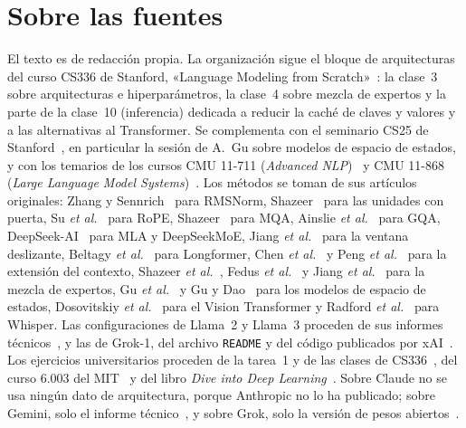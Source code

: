 \documentclass[11pt,a4paper,twoside,openany]{book}
\begin{document}
\section*{Sobre las fuentes}
El texto es de redacción propia. La organización sigue el bloque de arquitecturas del curso CS336 de Stanford, «Language Modeling from Scratch»~\cite{cs336}: la clase~3 sobre arquitecturas e hiperparámetros, la clase~4 sobre mezcla de expertos y la parte de la clase~10 (inferencia) dedicada a reducir la caché de claves y valores y a las alternativas al Transformer. Se complementa con el seminario CS25 de Stanford~\cite{cs25}, en particular la sesión de A.~Gu sobre modelos de espacio de estados, y con los temarios de los cursos CMU 11-711 (\emph{Advanced NLP})~\cite{cmu11711} y CMU 11-868 (\emph{Large Language Model Systems})~\cite{cmu11868}. Los métodos se toman de sus artículos originales: Zhang y Sennrich~\cite{rmsnorm} para RMSNorm, Shazeer~\cite{shazeerglu} para las unidades con puerta, Su \emph{et al.}~\cite{roformer} para RoPE, Shazeer~\cite{mqa} para MQA, Ainslie \emph{et al.}~\cite{gqa} para GQA, DeepSeek-AI~\cite{deepseekv2,deepseekv3} para MLA y DeepSeekMoE, Jiang \emph{et al.}~\cite{mistral} para la ventana deslizante, Beltagy \emph{et al.}~\cite{longformer} para Longformer, Chen \emph{et al.}~\cite{pi} y Peng \emph{et al.}~\cite{yarn} para la extensión del contexto, Shazeer \emph{et al.}~\cite{shazeer2017}, Fedus \emph{et al.}~\cite{switch} y Jiang \emph{et al.}~\cite{mixtral} para la mezcla de expertos, Gu \emph{et al.}~\cite{s4} y Gu y Dao~\cite{mamba} para los modelos de espacio de estados, Dosovitskiy \emph{et al.}~\cite{vit} para el Vision Transformer y Radford \emph{et al.}~\cite{whisper} para Whisper. Las configuraciones de Llama~2 y Llama~3 proceden de sus informes técnicos~\cite{llama2,llama3}, y las de Grok-1, del archivo \texttt{README} y del código publicados por xAI~\cite{grok1}. Los ejercicios universitarios proceden de la tarea~1 y de las clases de CS336~\cite{cs336a1,cs336}, del curso 6.003 del MIT~\cite{mit6003} y del libro \emph{Dive into Deep Learning}~\cite{d2l}. Sobre Claude no se usa ningún dato de arquitectura, porque Anthropic no lo ha publicado; sobre Gemini, solo el informe técnico~\cite{gemini15}, y sobre Grok, solo la versión de pesos abiertos~\cite{grok1}.
\end{document}
